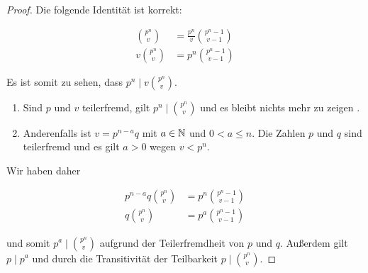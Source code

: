 \begin{proof}
  Die folgende Identität ist korrekt:
  \begin{widemath}
    \begin{equation*}
      \begin{aligned}
        \binom{p^n}{v}  & = \frac{p^n}{v}\binom{p^n - 1}{v - 1} \\
        v\binom{p^n}{v} & = p^n\binom{p^n - 1}{v - 1}
      \end{aligned}
    \end{equation*}
  \end{widemath}
  Es ist somit zu sehen, dass $p^n \mid v\binom{p^n}{v}$.
  \begin{enumerate}
    \item Sind $p$ und $v$ teilerfremd, gilt $p^n \mid \binom{p^n}{v}$ und es
          bleibt nichts mehr zu zeigen \parencite[64]{book:zahlentheorie}.
    \item Anderenfalls ist $v = p^{n-a}q$ mit $a \in \mathbb{N}$ und $0 < a \leq n$.
          Die Zahlen $p$ und $q$ sind teilerfremd und es gilt $a > 0$ wegen $v < p^n$.
  \end{enumerate}
  \noindent
  Wir haben daher
  \begin{widemath}
    \begin{align*}
      p^{n-a}q\binom{p^n}{v} & = p^n\binom{p^n - 1}{v - 1} \\
      q\binom{p^n}{v}        & = p^a\binom{p^n - 1}{v - 1}
    \end{align*}
  \end{widemath}
  \noindent
  und somit $p^a \mid \binom{p^n}{v}$ aufgrund der
  Teilerfremdheit von $p$ und $q$.
  Außerdem gilt $p \mid p^a$ und durch die
  Transitivität der Teilbarkeit $p \mid \binom{p^n}{v}$.
\end{proof}

